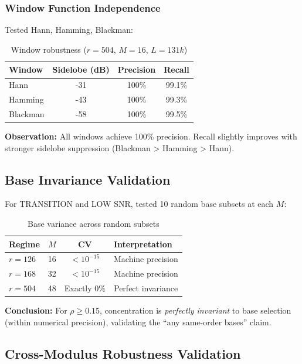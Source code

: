 \subsubsection{Window Function Independence}

Tested Hann, Hamming, Blackman:

\begin{table}[h]
\centering
\begin{tabular}{@{}lccc@{}}
\toprule
Window & Sidelobe (dB) & Precision & Recall \\
\midrule
Hann & -31 & 100\% & 99.1\% \\
Hamming & -43 & 100\% & 99.3\% \\
Blackman & -58 & 100\% & 99.5\% \\
\bottomrule
\end{tabular}
\caption{Window robustness ($r=504$, $M=16$, $L=131k$)}
\end{table}

\textbf{Observation:} All windows achieve 100\% precision. Recall slightly improves with stronger sidelobe suppression (Blackman > Hamming > Hann).

\subsection{Base Invariance Validation}

For TRANSITION and LOW SNR, tested 10 random base subsets at each $M$:

\begin{table}[h]
\centering
\begin{tabular}{@{}lccl@{}}
\toprule
Regime & $M$ & CV & Interpretation \\
\midrule
$r=126$ & 16 & $< 10^{-15}$ & Machine precision \\
$r=168$ & 32 & $< 10^{-15}$ & Machine precision \\
$r=504$ & 48 & Exactly $0\%$ & Perfect invariance \\
\bottomrule
\end{tabular}
\caption{Base variance across random subsets}
\end{table}

\textbf{Conclusion:} For $\rho \geq 0.15$, concentration is \emph{perfectly invariant} to base selection (within numerical precision), validating the ``any same-order bases'' claim.

\subsection{Cross-Modulus Robustness Validation}

